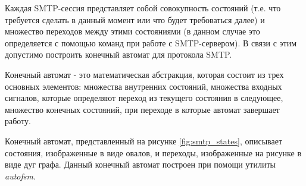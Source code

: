 \documentclass[a4paper,12pt]{report}
\begin{document}
	Каждая SMTP-сессия представляет собой совокупность состояний (т.е. что требуется сделать в данный момент или что будет требоваться далее) и множество переходов между этими состояниями (в данном случае это определяется с помощью команд при работе с SMTP-сервером). В связи с этим допустимо построить конечный автомат для протокола SMTP.

	Конечный автомат - это математическая абстракция, которая состоит из трех основных элементов: множества внутренних состояний, множества входных сигналов, которые определяют переход из текущего состояния в следующее, множество конечных состояний, при переходе в которые автомат завершает работу.

	Конечный автомат, представленный на рисунке \ref{fig:smtp_states}, описывает состояния, изображенные в виде овалов, и переходы, изображенные на рисунке в виде дуг графа. Данный конечный автомат построен при помощи утилиты \textit{autofsm}.
\end{document}
